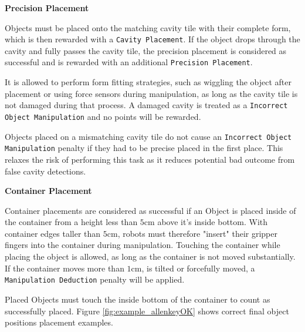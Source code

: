 \textbf{Precision Placement}

Objects must be placed onto the matching cavity tile with their complete form, which is then rewarded with a \texttt{Cavity Placement}.
If the object drops through the cavity and fully passes the cavity tile, the precision placement is considered as successful and is rewarded with an additional \texttt{Precision Placement}. 

It is allowed to perform form fitting strategies, such as wiggling the object after placement or using force sensors during manipulation,
as long as the cavity tile is not damaged during that process. A damaged cavity is treated as a \texttt{Incorrect Object Manipulation} and no points will be rewarded.

Objects placed on a mismatching cavity tile do not cause an \texttt{Incorrect Object Manipulation} penalty if they had to be precise placed in the first place. This relaxes the risk of performing this task as it reduces potential bad outcome from false cavity detections.
 

\textbf{Container Placement}

Container placements are considered as successful if an Object is placed inside of the container from a height less than $5\si{\centi\meter}$ above it's inside bottom. With container edges taller than $5\si{\centi\meter}$, robots must therefore "insert" their gripper fingers into the container during manipulation. Touching the container while placing the object is allowed, as long as the container is not moved substantially.
If the container moves more than $1\si{\centi\meter}$, is tilted or forcefully moved, a \texttt{Manipulation Deduction} penalty will be applied.

Placed Objects must touch the inside bottom of the container to count as successfully placed.
Figure \ref{fig:example_allenkeyOK} shows correct final object positions placement examples. 

